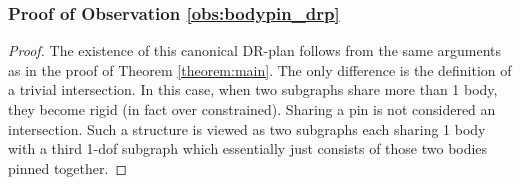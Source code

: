 \subsubsection{Proof of Observation \ref{obs:bodypin_drp}}
\begin{proof}
    The existence of this canonical DR-plan follows from the same arguments as in the proof of Theorem \ref{theorem:main}. The only difference is the definition of a trivial intersection. In this case, when two subgraphs share more than 1 body, they become rigid (in fact over constrained). Sharing a pin is not considered an intersection. Such a structure is viewed as two subgraphs each sharing 1 body with a third 1-dof subgraph which essentially just consists of those two bodies pinned together.
\end{proof}

